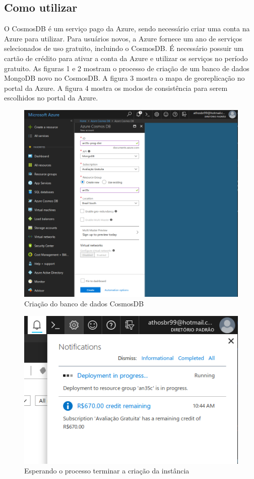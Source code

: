 \documentclass[12pt]{article}
\begin{document}
\subsection{Como utilizar}
O CosmosDB é um serviço pago da Azure, sendo necessário criar uma conta na Azure para utilizar. Para usuários novos, a Azure fornece um ano de serviços selecionados de uso gratuito, incluindo o CosmosDB. É necessário possuir um cartão de crédito
para ativar a conta da Azure e utilizar os serviços no período gratuito. As figuras 1 e 2 mostram o processo de criação de um banco de dados MongoDB novo no CosmosDB. A figura 3 mostra o mapa de 
georeplicação no portal da Azure. A figura 4 mostra os modos de consistência para serem escolhidos no portal da Azure.

\begin{figure}[H]
	\label{fig:az1}
	\caption{Criação do banco de dados CosmosDB} 
	\includegraphics[scale=0.27]{img/az1.png}
	\centering
\end{figure}

\begin{figure}[H]
	\label{fig:az2}
	\caption{Esperando o processo terminar a criação da instância}
	\includegraphics[scale=0.27]{img/az2.png}
	\centering
\end{figure}
\end{document}
